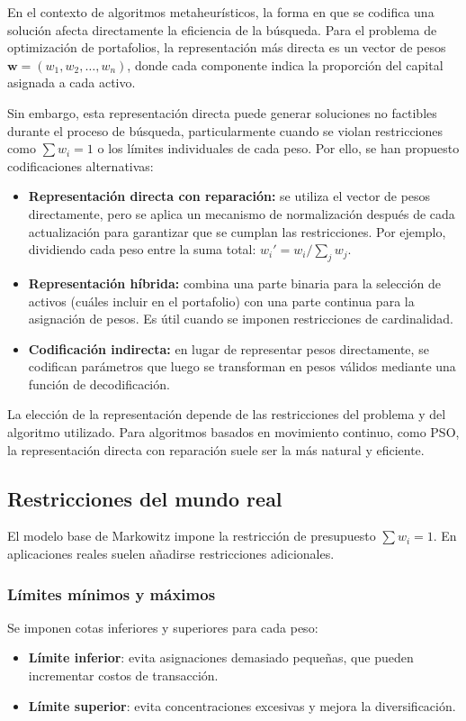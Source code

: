 En el contexto de algoritmos metaheurísticos, la forma en que se
codifica una solución afecta directamente la eficiencia de la
búsqueda. Para el problema de optimización de portafolios, la
representación más directa es un vector de pesos $\mathbf{w} = (w_1,
w_2, \ldots, w_n)$, donde cada componente indica la proporción del
capital asignada a cada activo.

Sin embargo, esta representación directa puede generar soluciones no
factibles durante el proceso de búsqueda, particularmente cuando se
violan restricciones como $\sum w_i = 1$ o los límites individuales
de cada peso. Por ello, se han propuesto codificaciones alternativas:

\begin{itemize}
  \item \textbf{Representación directa con reparación:} se utiliza el
    vector de pesos directamente, pero se aplica un mecanismo de
    normalización después de cada actualización para garantizar que
    se cumplan las restricciones. Por ejemplo, dividiendo cada peso
    entre la suma total: $w_i' = w_i / \sum_{j} w_j$.

  \item \textbf{Representación híbrida:} combina una parte binaria
    para la selección de activos (cuáles incluir en el portafolio)
    con una parte continua para la asignación de pesos. Es útil
    cuando se imponen restricciones de cardinalidad.

  \item \textbf{Codificación indirecta:} en lugar de representar
    pesos directamente, se codifican parámetros que luego se
    transforman en pesos válidos mediante una función de decodificación.
\end{itemize}

La elección de la representación depende de las restricciones del
problema y del algoritmo utilizado. Para algoritmos basados en
movimiento continuo, como PSO, la representación directa con
reparación suele ser la más natural y eficiente.

\subsection{Restricciones del mundo real}
El modelo base de Markowitz
impone la restricción de presupuesto $\sum w_i = 1$. En aplicaciones
reales suelen añadirse restricciones adicionales.

\subsubsection{Límites mínimos y máximos}
Se imponen cotas inferiores
y superiores para cada peso:
\begin{itemize}
  \item \textbf{Límite inferior}: evita asignaciones demasiado
    pequeñas, que pueden incrementar costos de transacción.
  \item \textbf{Límite superior}: evita concentraciones excesivas y
    mejora la diversificación.
\end{itemize}

